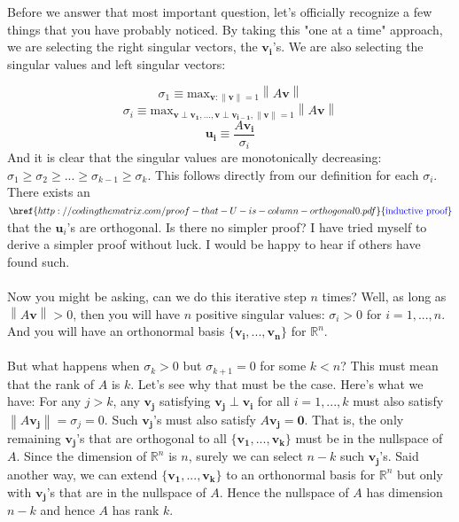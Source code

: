 \documentclass{tufte-handout}
\newcommand{\norm}[1]{\left\lVert#1\right\rVert}
\newcommand{\Waynehref}[3][blue]{\href{#2}{\color{#1}{#3}}}%
\begin{document}
\noindent Before we answer that most important question, let's officially recognize a few things that you have probably noticed. By taking this "one at a time" approach, we are selecting the right singular vectors, the $\mathbf{v_i}$'s. We are also selecting the singular values and left singular vectors:

\[
\sigma_{1}\equiv\text{max}_{\mathbf{v}:\norm{\mathbf{v}}=1}\norm{A\mathbf{v}}
\]
\[
\sigma_{i}\equiv\text{max}_{\mathbf{v}\perp\mathbf{v_1},...,\mathbf{v}\perp\mathbf{v_{i-1}},\norm{\mathbf{v}}=1}\norm{A\mathbf{v}}
\]
\[
\mathbf{u_i}\equiv\frac{A\mathbf{v_i}}{\sigma_{i}}
\]
And it is clear that the singular values are monotonically decreasing: $\sigma_{1}\geq\sigma_{2}\geq...\geq\sigma_{k-1}\geq\sigma_{k}$. This follows directly from our definition for each $\sigma_{i}$. There exists an $\Waynehref{http://codingthematrix.com/proof-that-U-is-column-orthogonal0.pdf}{\text{inductive proof}}$ that the $\mathbf{u}_i$'s are orthogonal. Is there no simpler proof? I have tried myself to derive a simpler proof without luck. I would be happy to hear if others have found such.\\\leavevmode\\

\noindent Now you might be asking, can we do this iterative step $n$ times? Well, as long as $\norm{A\mathbf{v}}>0$, then you will have $n$ positive singular values: $\sigma_{i}>0$ for $i=1,...,n$. And you will have an orthonormal basis $\{\mathbf{v_i},...,\mathbf{v_n}\}$ for $\mathbb{R}^n$.\\\leavevmode\\

\noindent But what happens when $\sigma_{k}>0$ but $\sigma_{k+1}=0$ for some $k<n$? This must mean that the rank of $A$ is $k$. Let's see why that must be the case. Here's what we have: For any $j>k$, any $\mathbf{v_{j}}$ satisfying $\mathbf{v_{j}}\perp \mathbf{v_i}$ for all $i=1,...,k$ must also satisfy $\norm{A\mathbf{v_{j}}}= \sigma_{j}=0$. Such $\mathbf{v_{j}}$'s must also satisfy $A\mathbf{v_{j}}=\mathbf{0}$. That is, the only remaining $\mathbf{v_{j}}$'s that are orthogonal to all $\{\mathbf{v_1},...,\mathbf{v_k}\}$ must be in the nullspace of $A$. Since the dimension of $\mathbb{R}^n$ is $n$, surely we can select $n-k$ such $\mathbf{v_{j}}$'s. Said another way, we can extend $\{\mathbf{v_1},...,\mathbf{v_k}\}$ to an orthonormal basis for $\mathbb{R}^n$ but only with $\mathbf{v_{j}}$'s that are in the nullspace of $A$. Hence the nullspace of $A$ has dimension $n-k$ and hence $A$ has rank $k$.\\\leavevmode\\
\end{document}

